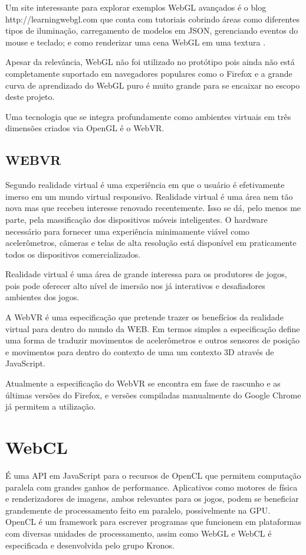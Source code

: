 \begin{draft}
Um site interessante para explorar exemplos WebGL avançados é o blog
http://learningwebgl.com que conta com tutoriais cobrindo áreas como
diferentes tipos de iluminação, carregamento de modelos em JSON,
gerenciando eventos do mouse e teclado; e como renderizar uma cena WebGL
em uma textura \autocite[pp.42]{3daps}.

Apesar da relevância, WebGL não foi utilizado no protótipo pois
ainda não está completamente suportado em navegadores populares como
o Firefox e a grande curva de aprendizado do WebGL puro é muito grande
para se encaixar no escopo deste projeto.

Uma tecnologia que se integra profundamente como ambientes virtuais
em três dimensões criados via OpenGL é o WebVR.
\end{draft}
\subsection{WEBVR}
Segundo \cite{virtualReality} realidade virtual é uma experiência em
que o usuário é efetivamente imerso em um mundo virtual responsivo.
Realidade virtual é uma área nem tão nova mas que recebeu interesse
renovado recentemente. Isso se dá, pelo menos me parte, pela
massificação dos dispositivos móveis inteligentes. O hardware
necessário para fornecer uma experiência minimamente viável como
acelerômetros, câmeras e telas de alta resolução está disponível
em praticamente todos os dispositivos comercializados.

Realidade virtual é uma área de grande interessa para os produtores
de jogos, pois pode oferecer alto nível de imersão nos já
interativos e desafiadores ambientes dos jogos.

A WebVR é uma especificação que pretende trazer os benefícios
da realidade virtual para dentro do mundo da WEB. Em termos simples
a especificação define uma forma de traduzir movimentos de
acelerômetros e outros sensores de posição e movimentos para dentro
do contexto de uma um contexto 3D através de JavaScript.

Atualmente a especificação do WebVR se encontra em fase de rascunho e
as últimas versões do Firefox, e versões compiladas manualmente do
Google Chrome já permitem a utilização.
\section{WebCL}
É uma API em JavaScript para o recursos de OpenCL que permitem
computação paralela com grandes ganhos de performance. Aplicativos
como motores de física e renderizadores de imagens, ambos relevantes
para os jogos, podem se beneficiar grandemente de processamento feito em
paralelo, possivelmente na GPU. OpenCL é um framework para escrever
programas que funcionem em plataformas com diversas unidades de
processamento, assim como WebGL e WebCL é especificada e desenvolvida
pelo grupo Kronos.

